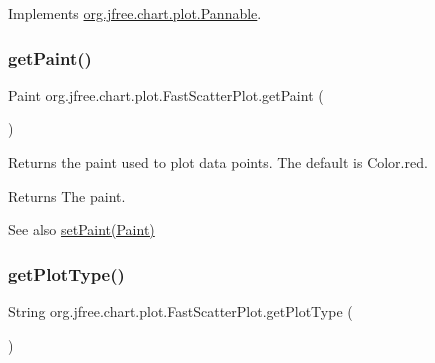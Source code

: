 Implements \mbox{\hyperlink{interfaceorg_1_1jfree_1_1chart_1_1plot_1_1_pannable_a09abf56f19f9173a9c1898ba03efdf8b}{org.\+jfree.\+chart.\+plot.\+Pannable}}.

\mbox{\label{classorg_1_1jfree_1_1chart_1_1plot_1_1_fast_scatter_plot_ab465594de61ac0750f08993b2a8d30d9}} 
\subsubsection{\texorpdfstring{get\+Paint()}{getPaint()}}
{\footnotesize\ttfamily Paint org.\+jfree.\+chart.\+plot.\+Fast\+Scatter\+Plot.\+get\+Paint (\begin{DoxyParamCaption}{ }\end{DoxyParamCaption})}

Returns the paint used to plot data points. The default is {\ttfamily Color.\+red}.

\begin{DoxyReturn}{Returns}
The paint.
\end{DoxyReturn}
\begin{DoxySeeAlso}{See also}
\mbox{\hyperlink{classorg_1_1jfree_1_1chart_1_1plot_1_1_fast_scatter_plot_ac6e77b9dddd49efb9053352792c606fe}{set\+Paint(\+Paint)}} 
\end{DoxySeeAlso}
\mbox{\label{classorg_1_1jfree_1_1chart_1_1plot_1_1_fast_scatter_plot_a61cecc74546e831b852884d1d2e782a7}} 
\subsubsection{\texorpdfstring{get\+Plot\+Type()}{getPlotType()}}
{\footnotesize\ttfamily String org.\+jfree.\+chart.\+plot.\+Fast\+Scatter\+Plot.\+get\+Plot\+Type (\begin{DoxyParamCaption}{ }\end{DoxyParamCaption})}

